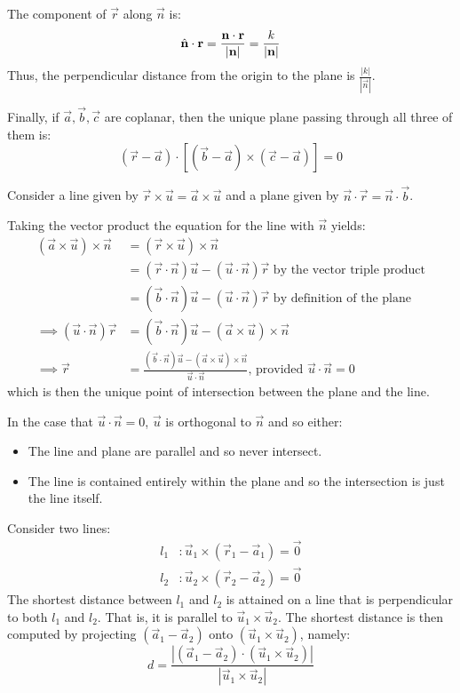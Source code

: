 \documentclass[../main.tex]{subfiles}
\begin{document}
The component of $\vec{r}$ along $\vec{n}$ is:
\[
  \hat{\mathbf{\bm{n}}} \cdot \mathbf{\bm{r}} = \frac{\mathbf{\bm{n}} \cdot \mathbf{\bm{r}}}{|\mathbf{\bm{n}}|} = \frac{k}{|\mathbf{\bm{n}}|}
\]
Thus, the perpendicular distance from the origin to the plane is $\frac{|k|}{|\vec{n}|}$.

Finally, if $\vec{a}, \vec{b}, \vec{c}$ are coplanar, then the unique plane passing through all three of them is:
\[
  (\vec{r} - \vec{a}) \cdot [(\vec{b} - \vec{a}) \times (\vec{c} - \vec{a})] = 0
\]
\begin{example}
  Consider a line given by $\vec{r} \times \vec{u} = \vec{a} \times \vec{u}$ and a plane given by $\vec{n} \cdot \vec{r} = \vec{n} \cdot \vec{b}$.

  Taking the vector product the equation for the line with $\vec{n}$ yields:
  \begin{align*}
    (\vec{a} \times \vec{u}) \times \vec{n} &= (\vec{r} \times \vec{u}) \times \vec{n}\\
                                            &= (\vec{r} \cdot \vec{n}) \vec{u} - (\vec{u} \cdot \vec{n}) \vec{r} \text{ by the vector triple product}\\
                                            &= (\vec{b} \cdot \vec{n}) \vec{u} - (\vec{u} \cdot \vec{n}) \vec{r} \text{ by definition of the plane}\\
    \implies (\vec{u} \cdot \vec{n})\vec{r} &= (\vec{b} \cdot \vec{n}) \vec{u} - (\vec{a} \times \vec{u}) \times \vec{n}\\
    \implies \vec{r} &= \frac{(\vec{b} \cdot\vec{n})\vec{u} - (\vec{a} \times \vec{u})\times\vec{n}}{\vec{u} \cdot\vec{n}} \text{, provided $\vec{u} \cdot \vec{n} = 0$}
  \end{align*}
  which is then the unique point of intersection between the plane and the line.

  In the case that $\vec{u} \cdot \vec{n} = 0$, $\vec{u}$ is orthogonal to $\vec{n}$ and so either:
  \begin{itemize}
    \item The line and plane are parallel and so never intersect.
    \item The line is contained entirely within the plane and so the intersection is just the line itself.
  \end{itemize}
\end{example}
\begin{example}
 Consider two lines:
 \begin{align*}
    l_1&: \vec{u}_1 \times (\vec{r}_1 - \vec{a}_1) = \vec{0} \\
    l_2&: \vec{u}_2 \times (\vec{r}_2 - \vec{a}_2) = \vec{0}
 \end{align*}
 The shortest distance between $l_1$ and $l_2$ is attained on a line that is perpendicular to both $l_1$ and $l_2$.
 That is, it is parallel to $\vec{u}_1 \times \vec{u}_2$.
 The shortest distance is then computed by projecting $(\vec{a}_1 - \vec{a}_2)$ onto $(\vec{u}_1 \times \vec{u}_2)$, namely:
 \[
   d = \frac{|(\vec{a}_1 - \vec{a}_2) \cdot (\vec{u}_1 \times \vec{u}_2)|}{|\vec{u}_1 \times \vec{u}_2|}
 \]
\end{example}
\end{document}
